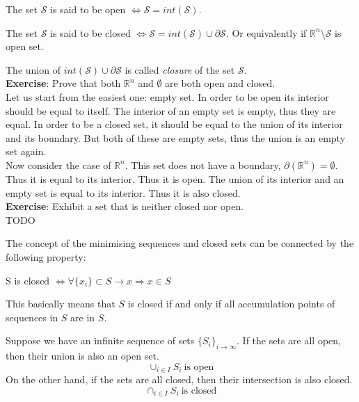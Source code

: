 \begin{definition}
    The set $\mathcal{S}$ is said to be open $\iff \mathcal{S} = \textit{int}(\mathcal{S})$.
\end{definition}
\begin{definition}
    The set $\mathcal{S}$ is said to be closed $\iff \mathcal{S} = \textit{int}(\mathcal{S}) \cup \partial \mathcal{S}$. Or equivalently if $\mathbb{R}^n \setminus \mathcal{S}$ is open set.
\end{definition}
The union of $\textit{int}(\mathcal{S}) \cup \partial \mathcal{S}$ is called \textit{closure} of the set $\mathcal{S}$.\\[5px]
\textbf{Exercise}: Prove that both $\mathbb{R}^n$ and $\emptyset$ are both open and closed.\\
Let us start from the easiest one: empty set. In order to be open its interior should be equal to itself. The interior of an empty set is empty, thus they are equal. In order to be a closed set, it should be equal to the union of its interior and its boundary. But both of these are empty sets, thus the union is an empty set again.\\
Now consider the case of $\mathbb{R}^n$. This set does not have a boundary, $\partial(\mathbb{R}^n) = \emptyset$. Thus it is equal to its interior. Thus it is open. The union of its interior and an empty set is equal to its interior. Thus it is also closed.\\[3px]
\textbf{Exercise}: Exhibit a set that is neither closed nor open.\\
TODO
\par The concept of the minimising sequences and closed sets can be connected by the following property:
\begin{theorem}
    S is closed $\iff \forall \{x_i\} \subset S \rightarrow x \Rightarrow x \in S$
\end{theorem}
This basically means that $S$ is closed if and only if all accumulation points of sequences in $S$ are in $S$.
\par Suppose we have an infinite sequence of sets $\{S_i\}_{i \rightarrow \infty}$. If the sets are all open, then their union is also an open set.
\begin{equation}
    \cup_{i \in I} S_i\ \text{is open}
\end{equation}
On the other hand, if the sets are all closed, then their intersection is also closed.
\begin{equation}
    \cap_{i \in I} S_i\ \text{is closed}
\end{equation}
